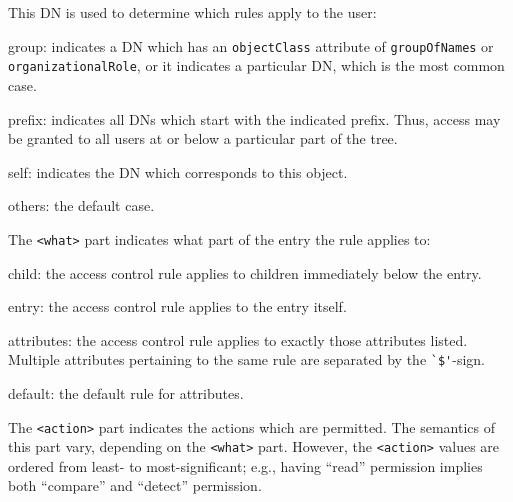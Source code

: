This DN is used to determine which rules apply to the user:
\begin{describe}
\item[group:]	indicates a DN which has an \verb"objectClass" attribute
		of \verb"groupOfNames" or \verb"organizationalRole",
		or it indicates a particular DN, which is the most
		common case.

\item[prefix:]	indicates all DNs which start with the indicated
		prefix.  Thus, access may be granted to all users
		at or below a particular part of the tree.

\item[self:]	indicates the DN which corresponds to this object.

\item[others:]	the default case.
\end{describe}
The \verb"<what>" part indicates what part of the entry the rule applies
to:
\begin{describe}
\item[child:]	the access control rule applies to children immediately below
		the entry.

\item[entry:]	the access control rule applies to the entry itself.

\item[attributes:] the access control rule applies to exactly those
		attributes listed.
		Multiple attributes pertaining to the same rule are
		separated by the \verb"`$'"-sign.

\item[default:]	the default rule for attributes.
\end{describe}
The \verb"<action>" part indicates the actions which are permitted.
The semantics of this part vary, depending on the \verb"<what>" part.
However,
the \verb"<action>" values are ordered from least- to most-significant;
e.g., having ``read'' permission implies both ``compare'' and ``detect''
permission.
